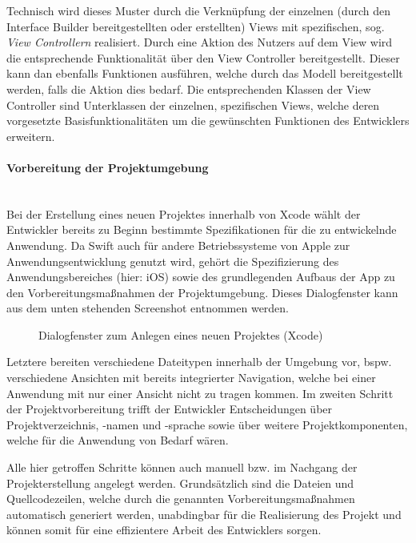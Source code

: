 
Technisch wird dieses Muster durch die Verknüpfung der einzelnen (durch den Interface Builder bereitgestellten oder erstellten) Views mit spezifischen, sog. \textit{View Controllern} realisiert. Durch eine Aktion des Nutzers auf dem View wird die entsprechende Funktionalität über den View Controller bereitgestellt. Dieser kann dan ebenfalls Funktionen ausführen, welche durch das Modell bereitgestellt werden, falls die Aktion dies bedarf. Die entsprechenden Klassen der View Controller sind Unterklassen der einzelnen, spezifischen Views, welche deren vorgesetzte Basisfunktionalitäten um die gewünschten Funktionen des Entwicklers erweitern.

\paragraph{Vorbereitung der Projektumgebung}\mbox{}\\
Bei der Erstellung eines neuen Projektes innerhalb von Xcode wählt der Entwickler bereits zu Beginn bestimmte Spezifikationen für die zu entwickelnde Anwendung. Da Swift auch für andere Betriebssysteme von Apple zur Anwendungsentwicklung genutzt wird, gehört die Spezifizierung des Anwendungsbereiches (hier: iOS) sowie des grundlegenden Aufbaus der App zu den Vorbereitungsmaßnahmen der Projektumgebung. Dieses Dialogfenster kann aus dem unten stehenden Screenshot entnommen werden.

\begin{figure}
	\centering
	\caption{Dialogfenster zum Anlegen eines neuen Projektes (Xcode)}
\end{figure}

Letztere bereiten verschiedene Dateitypen innerhalb der Umgebung vor, bspw. verschiedene Ansichten mit bereits integrierter Navigation, welche bei einer Anwendung mit nur einer Ansicht nicht zu tragen kommen. Im zweiten Schritt der Projektvorbereitung trifft der Entwickler Entscheidungen über Projektverzeichnis, -namen und -sprache sowie über weitere Projektkomponenten, welche für die Anwendung von Bedarf wären.

Alle hier getroffen Schritte können auch manuell bzw. im Nachgang der Projekterstellung angelegt werden. Grundsätzlich sind die Dateien und Quellcodezeilen, welche durch die genannten Vorbereitungsmaßnahmen automatisch generiert werden, unabdingbar für die Realisierung des Projekt und können somit für eine effizientere Arbeit des Entwicklers sorgen.

